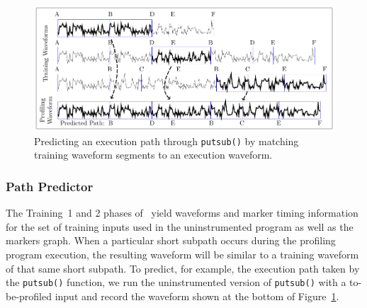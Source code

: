 \begin{figure}[t]
\centering
\includegraphics[width=\textwidth]{../issta_profile/profiling/figures/segment_match}
\caption{Predicting an execution path through \texttt{putsub()} by matching training waveform segments to an execution waveform.}
\label{fig:segment_match}
\end{figure}


\subsubsection{Path Predictor}
\label{sec:path_predict_algo}

The Training~1 and 2 phases of \zop\ yield waveforms and marker timing information for the set of training inputs used in the uninstrumented program as well as the markers graph. When a particular short subpath occurs during the profiling program execution, the resulting waveform will be similar to a training waveform of that same short subpath. To predict, for example, the execution path taken by the \texttt{putsub()} function, we run the uninstrumented version of \texttt{putsub()} with a to-be-profiled input and record the waveform shown at the bottom of Figure~\ref{fig:segment_match}.

